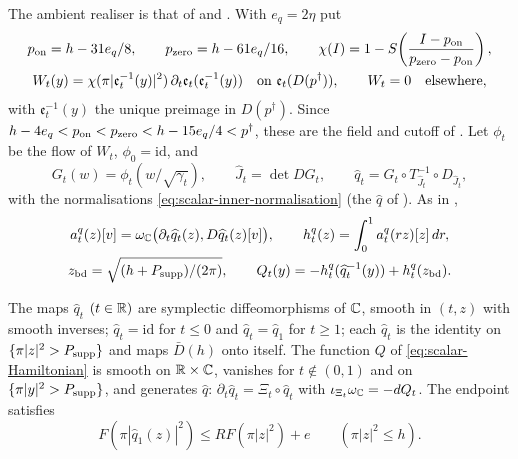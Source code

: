 The ambient realiser is that of  and . With $e_q=2\eta$ put
\begin{gather}\label{eq:scalar-source-cutoff}
 p_{\rm on}=h-31e_q/8,\qquad p_{\rm zero}=h-61e_q/16,\qquad
 \chi(I)=1-S\!\left(\frac{I-p_{\rm on}}{p_{\rm zero}-p_{\rm on}}\right),\\
 W_t(y)=\chi(\pi|\mathfrak e_t^{-1}(y)|^2)\,
             \partial_t\mathfrak e_t(\mathfrak e_t^{-1}(y))
 \quad\text{on }\mathfrak e_t(D(p^\dagger)),\qquad W_t=0\quad\text{elsewhere},\notag
\end{gather}
with $\mathfrak e_t^{-1}(y)$ the unique preimage in $D(p^\dagger)$. Since $h-4e_q<p_{\rm on}<p_{\rm zero}<h-15e_q/4<p^\dagger$, these are the field and cutoff of . Let $\phi_t$ be the flow of $W_t$, $\phi_0=\mathrm{id}$, and
\begin{equation}\label{eq:scalar-qhat}
 G_t(w)=\phi_t(w/\sqrt{\gamma_t}),\qquad \widehat J_t=\det DG_t,\qquad
 \widehat q_t=G_t\circ T_{\widehat J_t}^{-1}\circ D_{\widehat J_t},
\end{equation}
with the normalisations \eqref{eq:scalar-inner-normalisation} (the $\hat q$ of ). As in ,
\begin{gather}\label{eq:scalar-Hamiltonian}
 a^q_t(z)[v]=\omega_{\mathbb{C}}\bigl(\partial_t\widehat q_t(z),D\widehat q_t(z)[v]\bigr),\qquad
 h^q_t(z)=\int_0^1a^q_t(rz)[z]\,dr,\\
 z_{\rm bd}=\sqrt{(h+P_{\rm supp})/(2\pi)},\qquad
 Q_t(y)=-h^q_t(\widehat q_t^{-1}(y))+h^q_t(z_{\rm bd}).\notag
\end{gather}

\begin{proposition}\label{prop:scalar-planar-realisation}
The maps $\widehat q_t$ $(t\in\mathbb{R})$ are symplectic diffeomorphisms of $\mathbb{C}$, smooth in $(t,z)$ with smooth inverses;
$\widehat q_t=\mathrm{id}$ for $t\le0$ and $\widehat q_t=\widehat q_1$ for $t\ge1$; each $\widehat q_t$ is the identity on
$\{\pi|z|^2>P_{\rm supp}\}$ and maps $\bar D(h)$ onto itself. The function $Q$ of \eqref{eq:scalar-Hamiltonian} is smooth
on $\mathbb{R}\times\mathbb{C}$, vanishes for $t\notin(0,1)$ and on $\{\pi|y|^2>P_{\rm supp}\}$, and generates $\widehat q$:
$\partial_t\widehat q_t=\Xi_t\circ\widehat q_t$ with $\iota_{\Xi_t}\omega_{\mathbb{C}}=-dQ_t$. The endpoint satisfies
\begin{equation}\label{eq:scalar-full-comparison}
 F(\pi|\widehat q_1(z)|^2)\le RF(\pi|z|^2)+e\qquad(\pi|z|^2\le h).
\end{equation}
{\normalfont {}}
\end{proposition}

